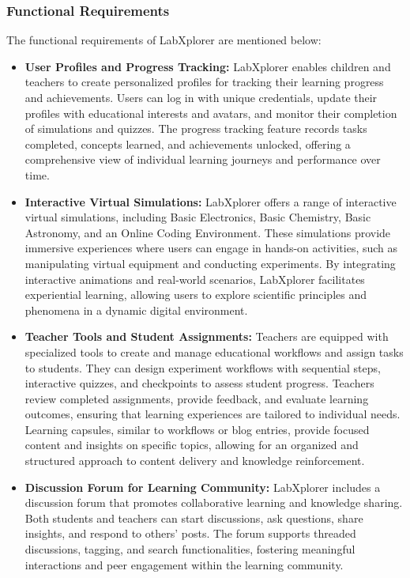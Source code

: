 \subsubsection{Functional Requirements}The functional requirements of LabXplorer are mentioned below:
\begin{itemize}
    \item \textbf{User Profiles and Progress Tracking:} LabXplorer enables children and teachers to create personalized profiles for tracking their learning progress and achievements. Users can log in with unique credentials, update their profiles with educational interests and avatars, and monitor their completion of simulations and quizzes. The progress tracking feature records tasks completed, concepts learned, and achievements unlocked, offering a comprehensive view of individual learning journeys and performance over time.

    \item \textbf{Interactive Virtual Simulations:} LabXplorer offers a range of interactive virtual simulations, including Basic Electronics, Basic Chemistry, Basic Astronomy, and an Online Coding Environment. These simulations provide immersive experiences where users can engage in hands-on activities, such as manipulating virtual equipment and conducting experiments. By integrating interactive animations and real-world scenarios, LabXplorer facilitates experiential learning, allowing users to explore scientific principles and phenomena in a dynamic digital environment.

    \item \textbf{Teacher Tools and Student Assignments:} Teachers are equipped with specialized tools to create and manage educational workflows and assign tasks to students. They can design experiment workflows with sequential steps, interactive quizzes, and checkpoints to assess student progress. Teachers review completed assignments, provide feedback, and evaluate learning outcomes, ensuring that learning experiences are tailored to individual needs. Learning capsules, similar to workflows or blog entries, provide focused content and insights on specific topics, allowing for an organized and structured approach to content delivery and knowledge reinforcement.

    \item \textbf{Discussion Forum for Learning Community:} LabXplorer includes a discussion forum that promotes collaborative learning and knowledge sharing. Both students and teachers can start discussions, ask questions, share insights, and respond to others' posts. The forum supports threaded discussions, tagging, and search functionalities, fostering meaningful interactions and peer engagement within the learning community.


\end{itemize}
